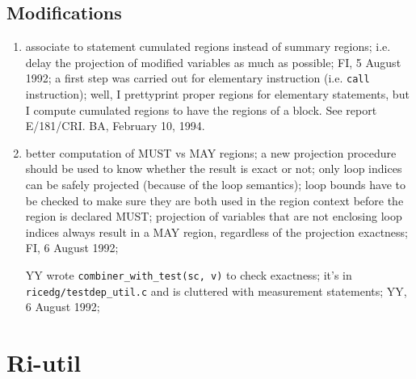 \subsection{Modifications}

\begin{enumerate}

  \item associate to statement cumulated regions instead of summary regions;
        i.e. delay the projection of modified variables as much as
        possible; FI, 5 August 1992; a first step was carried out for
        elementary instruction (i.e. \verb+call+ instruction); well, I
        prettyprint proper regions for elementary statements, but I
        compute cumulated regions to have the regions of a block. See
        report E/181/CRI. BA, February 10, 1994.
        

  \item better computation of MUST vs MAY regions; a new projection procedure
        should be used to know whether the result is exact or not; only
        loop indices can be safely projected (because of the loop semantics);
        loop bounds have to be checked to make sure they are both used
        in the region context before the region is declared MUST; projection
        of variables that are not enclosing loop indices always result
        in a MAY region, regardless of the projection exactness;
        FI, 6 August 1992;

        YY wrote \verb+combiner_with_test(sc, v)+ to check exactness;
        it's in \verb+ricedg/testdep_util.c+ and is cluttered with
        measurement statements; YY, 6 August 1992;

\end{enumerate}

\section{Ri-util}

